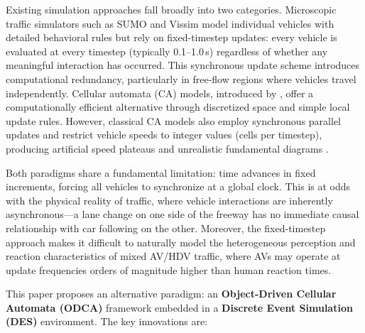 \documentclass[review,authoryear]{elsarticle}
\begin{document}
Existing simulation approaches fall broadly into two categories. Microscopic traffic simulators such as SUMO \citep{lopez2018microscopic} and Vissim \citep{fellendorf2010microscopic} model individual vehicles with detailed behavioral rules but rely on fixed-timestep updates: every vehicle is evaluated at every timestep (typically 0.1--1.0\,s) regardless of whether any meaningful interaction has occurred. This synchronous update scheme introduces computational redundancy, particularly in free-flow regions where vehicles travel independently. Cellular automata (CA) models, introduced by \citet{nagel1992cellular}, offer a computationally efficient alternative through discretized space and simple local update rules. However, classical CA models also employ synchronous parallel updates and restrict vehicle speeds to integer values (cells per timestep), producing artificial speed plateaus and unrealistic fundamental diagrams \citep{maerivoet2005cellular}.

Both paradigms share a fundamental limitation: time advances in fixed increments, forcing all vehicles to synchronize at a global clock. This is at odds with the physical reality of traffic, where vehicle interactions are inherently asynchronous---a lane change on one side of the freeway has no immediate causal relationship with car following on the other. Moreover, the fixed-timestep approach makes it difficult to naturally model the heterogeneous perception and reaction characteristics of mixed AV/HDV traffic, where AVs may operate at update frequencies orders of magnitude higher than human reaction times.

This paper proposes an alternative paradigm: an \textbf{Object-Driven Cellular Automata (ODCA)} framework embedded in a \textbf{Discrete Event Simulation (DES)} environment. The key innovations are:
\end{document}

